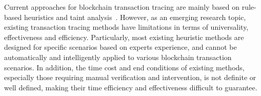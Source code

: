 
Current approaches for blockchain transaction tracing \cite{zhao2015graph,phetsouvanh2018egret,oggier2020ego,tironsakkul2019probing} are mainly based on rule-based heuristics and taint analysis~\cite{moser2014towards}. 
However, as an emerging research topic, existing transaction tracing methods have limitations in terms of universality, effectiveness and efficiency. Particularly, most existing heuristic methods are designed for specific scenarios based on experts experience, and cannot be automatically and intelligently applied to various blockchain transaction scenarios. In addition, the time cost and end conditions of existing methods, especially those requiring manual verification and intervention, is not definite or well defined, making their time efficiency and effectiveness difficult to guarantee.

